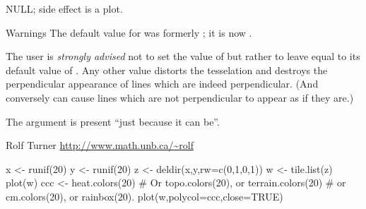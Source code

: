 \begin{Value}
NULL; side effect is a plot.
\end{Value}
\begin{Section}{Warnings}
The default value for  was formerly ;
it is now .

The user is \emph{strongly advised} not to set the value of
 but rather to leave  equal to its default
value of .  Any other value distorts the tesselation
and destroys the perpendicular appearance of lines which are
indeed perpendicular.  (And conversely can cause lines which
are not perpendicular to appear as if they are.)

The argument  is present ``just because it can be''.
\end{Section}
\begin{Author}\relax
Rolf Turner
\url{http://www.math.unb.ca/~rolf}
\end{Author}
\begin{SeeAlso}\relax
{}
\end{SeeAlso}
\begin{Examples}
\begin{ExampleCode}
  x <- runif(20)
  y <- runif(20)
  z <- deldir(x,y,rw=c(0,1,0,1))
  w <- tile.list(z)
  plot(w)
  ccc <- heat.colors(20) # Or topo.colors(20), or terrain.colors(20)
                         # or cm.colors(20), or rainbox(20).
  plot(w,polycol=ccc,close=TRUE)
\end{ExampleCode}
\end{Examples}

